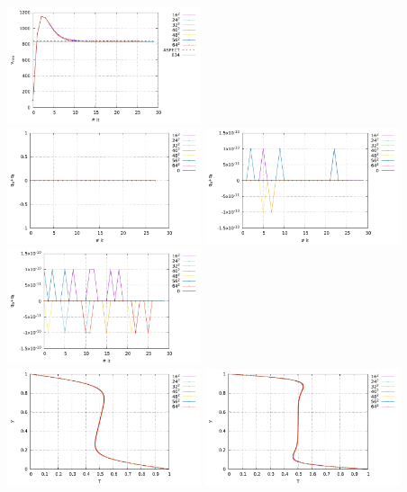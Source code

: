 \begin{center}
\includegraphics[width=5.7cm]{python_codes/fieldstone_110/results_BA/vrms_Ra1e6.pdf}\\
\includegraphics[width=5.7cm]{python_codes/fieldstone_110/results_BA/q_Ra1e4.pdf}
\includegraphics[width=5.7cm]{python_codes/fieldstone_110/results_BA/q_Ra1e5.pdf}
\includegraphics[width=5.7cm]{python_codes/fieldstone_110/results_BA/q_Ra1e6.pdf}\\
\includegraphics[width=5.7cm]{python_codes/fieldstone_110/results_BA/T_profile_Ra1e4.pdf}
\includegraphics[width=5.7cm]{python_codes/fieldstone_110/results_BA/T_profile_Ra1e5.pdf}

\end{center}
